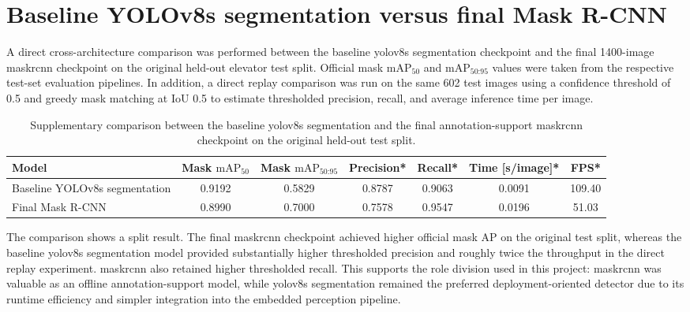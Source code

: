 \section{Baseline YOLOv8s segmentation versus final Mask R-CNN}
\label{app:yolo_vs_maskrcnn}

A direct cross-architecture comparison was performed between the baseline
\gls{yolo}v8s segmentation checkpoint and the final 1400-image \gls{maskrcnn}
checkpoint on the original held-out elevator test split. Official mask
$\mathrm{mAP}_{50}$ and $\mathrm{mAP}_{50\text{:}95}$ values were taken from the
respective test-set evaluation pipelines. In addition, a direct replay
comparison was run on the same 602 test images using a confidence threshold of
0.5 and greedy mask matching at IoU 0.5 to estimate thresholded precision,
recall, and average inference time per image.

\begin{table}[htbp]
    \centering
    \caption{Supplementary comparison between the baseline \gls{yolo}v8s segmentation and
    the final annotation-support \gls{maskrcnn} checkpoint on the original held-out
    test split.}
    \label{tab:yolo_vs_maskrcnn_original_test}
    \begin{tabular}{lcccccc}
        \toprule
        Model & Mask $\mathrm{mAP}_{50}$ & Mask $\mathrm{mAP}_{50\text{:}95}$ & Precision* & Recall* & Time [s/image]* & FPS* \\
        \midrule
        Baseline YOLOv8s segmentation & 0.9192 & 0.5829 & 0.8787 & 0.9063 & 0.0091 & 109.40 \\
        Final Mask R-CNN & 0.8990 & 0.7000 & 0.7578 & 0.9547 & 0.0196 & 51.03 \\
        \bottomrule
    \end{tabular}
\end{table}

The comparison shows a split result. The final \gls{maskrcnn} checkpoint achieved
higher official mask AP on the original test split, whereas the baseline
\gls{yolo}v8s segmentation model provided substantially higher thresholded precision and
roughly twice the throughput in the direct replay experiment. \Gls{maskrcnn}
also retained higher thresholded recall. This supports the role division used in
this project: \gls{maskrcnn} was valuable as an offline annotation-support model,
while \gls{yolo}v8s segmentation remained the preferred deployment-oriented detector due to
its runtime efficiency and simpler integration into the embedded perception
pipeline.

